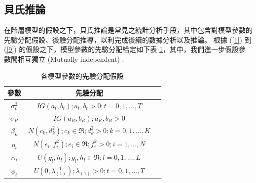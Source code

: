 \documentclass[12pt,a4paper]{article}
\begin{document}
\begin{CJK}{UTF8}{bkai}
\subsection{貝氏推論}\label{sec:2.2}
在階層模型的假設之下，貝氏推論是常見之統計分析手段，其中包含對模型參數的先驗分配假設、後驗分配推導，以利完成後續的數據分析以及推論。
根據 (\ref{1}) 到 (\ref{9}) 的假設之下，模型參數的先驗分配給定如下表 \ref{tab:1}，其中，我們進一步假設參數間相互獨立 (Mutually independent) :

\begin{table}[H]
\centering
\setlength{\belowcaptionskip}{0.5cm}
\caption{各模型參數的先驗分配假設}
\begin{tabular}{ccc}
\hline
參數 & 先驗分配\\
\hline
$\sigma_t^2$ & $IG\left(a_t,b_t\right); a_t,b_t >0; t=0,1,\dots,T$\\
$\sigma_R$ & $IG\left(a_R,b_R\right); a_R,b_R >0$\\
$\beta_k$ & $N\left(c_k,d_k^2\right); c_k \in \Re; d_k^2 > 0; k=0,1,\dots,K$\\
$\eta_i$ & $N\left(e_i,f_i^2\right); e_i \in \Re; f_i^2 > 0; i=1,\dots,N$\\
$\alpha_l$ & $U\left(g_l,h_l\right); g_l,h_l \in \Re; l=0,1,\dots,L$\\
$\phi_t$ & $U\left(0,\lambda_{(1)}^{-1}\right); \lambda_{(1)} >0; t=0,1,\dots,T$\\
\hline
\end{tabular}
\label{tab:1}
\end{table}


\end{CJK}
\end{document}
